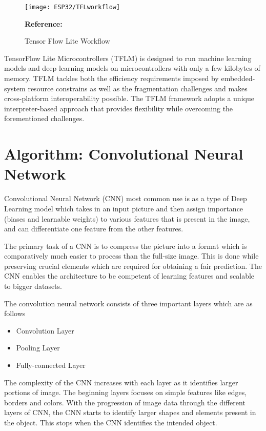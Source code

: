 \begin{figure}  
	\begin{center}
		\texttt{[image: ESP32/TFLworkflow]}
		\caption{Tensor Flow Lite Workflow} 
		\label{fig:Visual Studio Code Download Options}
		\footnotesize \textbf{Reference:} \cite{Khandelwal:2020}
	\end{center}
\end{figure}

TensorFlow Lite Microcontrollers (TFLM) is designed to run machine learning models and deep learning models on microcontrollers with only a few kilobytes of memory. TFLM tackles both the efficiency requirements imposed by embedded-system resource constrains as well as the fragmentation challenges and makes cross-platform interoperability possible. The TFLM framework adopts a unique interpreter-based approach that provides flexibility while overcoming the forementioned challenges.\cite{Robert:2021}

\section{Algorithm: Convolutional Neural Network}

Convolutional Neural Network (CNN) most common use is as a type of Deep Learning model which takes in an input picture and then assign importance (biases and learnable weights) to various features that is present in the image, and can differentiate one feature from the other features. 

The primary task of a CNN is to compress the picture into a format which is comparatively much easier to process than the full-size image. This is done while preserving crucial elements which are required for obtaining a fair prediction. The CNN enables the architecture to be competent of learning features and scalable to bigger datasets.  \cite{Saha:2018}

The convolution neural network consists of three important layers which are as follows
\begin{itemize}
	\item	Convolution Layer
	\item	Pooling Layer
	\item	Fully-connected Layer
\end{itemize}
	
The complexity of the CNN increases with each layer as it identifies larger portions of image. The beginning layers focuses on simple features like edges, borders and colors. With the progression of image data through the different layers of CNN, the CNN starts to identify larger shapes and elements present in the object. This stops when the CNN identifies the intended object. \cite{IBM:2020}

